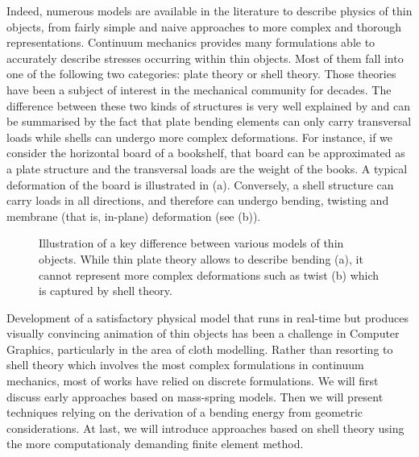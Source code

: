 Indeed, numerous models are available in the literature to describe physics of thin objects, from fairly simple and naive approaches to more complex and thorough representations. Continuum mechanics provides many formulations able to accurately describe stresses occurring within thin objects. Most of them fall into one of the following two categories: plate theory or shell theory. Those theories have been a subject of interest in the mechanical community for decades. The difference between these two kinds of structures is very well explained by \cite{Liu03} and can be summarised by the fact that plate bending elements can only carry transversal loads while shells can undergo more complex deformations. 
For instance, if we consider the horizontal board of a bookshelf, that board can be approximated as a plate structure and the transversal loads are the weight of the books. A typical deformation of the board is illustrated in  (a). Conversely, a shell structure can carry loads in all directions, and therefore can undergo bending, twisting and membrane (that is, in-plane) deformation (see  (b)). 
%
\begin{figure}[ht]
\centering 
{}
\hfill 
{}
\caption[Illustration of the key difference between plate and shell theory]{Illustration of a key difference between various models of thin objects. While thin plate theory allows to describe bending (a), it cannot represent more complex deformations such as twist (b) which is captured by shell theory.}
\label{chap7:fig-boards}
\end{figure}


Development of a satisfactory physical model that runs in real-time but produces visually convincing animation of thin objects has been a challenge in Computer Graphics, particularly in the area of cloth modelling. Rather than resorting to shell theory which involves the most complex formulations in continuum mechanics, most of works have relied on discrete formulations. We will first discuss early approaches based on mass-spring models. Then we will present techniques relying on the derivation of a bending energy from geometric considerations. At last, we will introduce approaches based on shell theory using the more computationaly demanding finite element method.

		
